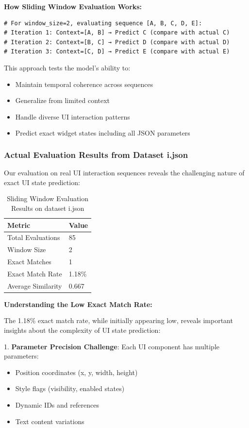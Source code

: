 \documentclass[12pt,a4paper]{article}
\begin{document}
\textbf{How Sliding Window Evaluation Works:}

\begin{lstlisting}[caption=Sliding Window Evaluation Process]
# For window_size=2, evaluating sequence [A, B, C, D, E]:
# Iteration 1: Context=[A, B] → Predict C (compare with actual C)
# Iteration 2: Context=[B, C] → Predict D (compare with actual D)
# Iteration 3: Context=[C, D] → Predict E (compare with actual E)
\end{lstlisting}

This approach tests the model's ability to:
\begin{itemize}
\item Maintain temporal coherence across sequences
\item Generalize from limited context
\item Handle diverse UI interaction patterns
\item Predict exact widget states including all JSON parameters
\end{itemize}

\subsubsection{Actual Evaluation Results from Dataset i.json}

Our evaluation on real UI interaction sequences reveals the challenging nature of exact UI state prediction:

\begin{table}[H]
\centering
\begin{tabular}{|l|l|}
\hline
\textbf{Metric} & \textbf{Value} \\
\hline
Total Evaluations & 85 \\
Window Size & 2 \\
Exact Matches & 1 \\
Exact Match Rate & 1.18\% \\
Average Similarity & 0.667 \\
\hline
\end{tabular}
\caption{Sliding Window Evaluation Results on dataset i.json}
\label{tab:actual-results}
\end{table}

\textbf{Understanding the Low Exact Match Rate:}

The 1.18\% exact match rate, while initially appearing low, reveals important insights about the complexity of UI state prediction:

1. \textbf{Parameter Precision Challenge}: Each UI component has multiple parameters:
\begin{itemize}
\item Position coordinates (x, y, width, height)
\item Style flags (visibility, enabled states)
\item Dynamic IDs and references
\item Text content variations
\end{itemize}
\end{document}
